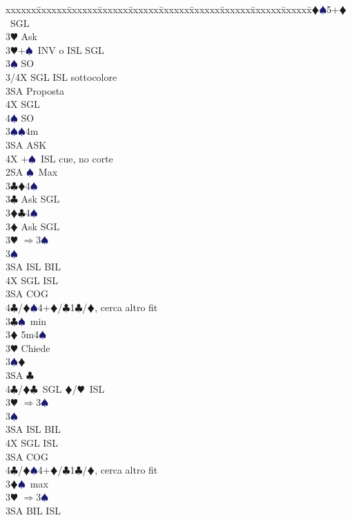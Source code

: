 \documentclass[a4paper,italian]{article}
\newcommand{\BC}{\textcolor{OliveGreen}{$\clubsuit$}}
\newcommand{\BD}{\textcolor{RedOrange}{$\vardiamondsuit$}}
\newcommand{\BH}{\textcolor{Red2}{$\varheartsuit${}}}
\newcommand{\BS}{\textcolor{MidnightBlue}{$\spadesuit${}}}
\newenvironment{bidtable}
{\begin{tabbing}

    xxxxxx\=xxxxxx\=xxxxxx\=xxxxxx\=xxxxxx\=xxxxxx\=xxxxxx\=xxxxxx\=xxxxxx\=xxxxxx\=\kill}
{\end{tabbing} }%
\begin{document}
\begin{multicols}{2}
\begin{bidtable}
        3\BD {}\BS 5+\BD\ SGL\+\\
        3\BH \> Ask\-\\
        3\BH {}+\BS\ INV o ISL SGL\+\\
        3\BS \> SO\+\\
        3/4X \> SGL ISL sottocolore\-\\
        3SA \> Proposta\+\\
        4X \> SGL\\
        4\BS \> SO\-\-\\
        3\BS {}\BS 4m\+\\
        3SA \> ASK\-\\
        4X +\BS\ ISL cue, no corte\-\\
        2SA \BS\ Max\+\\
        3\BC {}\BD 4\BS \+\\
        3\BC \> Ask SGL\-\\
        3\BD {}\BC 4\BS \+\\
        3\BD \> Ask SGL\-\\
        3\BH \> $\Rightarrow$3\BS\+\\
        3\BS\+\\
        3SA \> ISL BIL\\
        4X \> SGL ISL\-\-\\
        3SA \> COG\\
        4\BC/\BD {}\BS4+\BD/\BC1\BC/\BD, cerca altro fit \-\\
        3\BC {}\BS\ min\+\\
        3\BD \> 5m4\BS \+\\
        3\BH \> Chiede\+\\
        3\BS {}\BD \\
        3SA \BC \\
        4\BC/\BD {}\BC\ SGL \BD /\BH\ ISL \-\-\\
        3\BH \> $\Rightarrow$3\BS\+\\
        3\BS\+\\
        3SA \> ISL BIL\\
        4X \> SGL ISL\-\-\\
        3SA \> COG\\
        4\BC/\BD {}\BS4+\BD/\BC1\BC/\BD, cerca altro fit \-\\
        3\BD {}\BS\ max\+\\
        3\BH \> $\Rightarrow$3\BS\+\\
        3SA \> BIL ISL\\

\end{bidtable}
\end{multicols}
\end{document}
